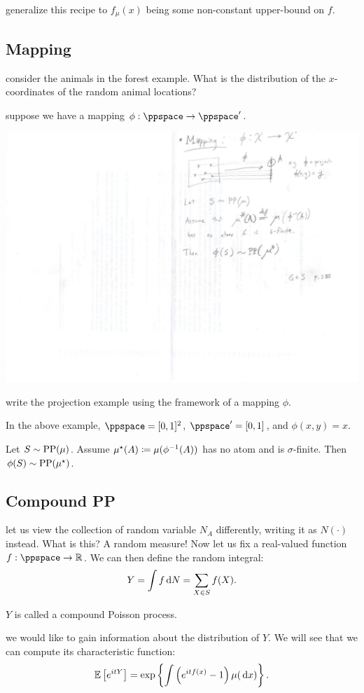 \documentclass{article}
\begin{document}
 generalize this recipe to $f_\mu(x)$ being some non-constant upper-bound on $f$. 


\subsection{Mapping}

 consider the animals in the forest example. What is the distribution of the $x$-coordinates of the random animal locations?

 suppose we have a mapping $\phi : \ppspace \to \ppspace'$.
\begin{center}
	\includegraphics[width=0.5\linewidth]{figures/pp-mapping} 
\end{center} 
 write the projection example using the framework of a mapping $\phi$.

 In the above example, $\ppspace = [0,1]^2$, $\ppspace' = [0,1]$, and $\phi(x, y) = x$.

 Let $S \sim \operatorname{PP}(\mu)$. Assume $\mu^\star(A) \coloneqq \mu(\phi^{-1}(A))$ has no atom and is $\sigma$-finite. Then $\phi(S) \sim \operatorname{PP}(\mu^\star)$.


\subsection{Compound PP}

 let us view the collection of random variable $N_A$ differently, writing it as $N(\cdot)$ instead. What is this? A random measure! Now let us fix a real-valued function $f : \ppspace \to \R$. We can then define the random integral:
\[ Y = \int f \,\mathrm{d} N = \sum_{X \in S} f(X). \]

 $Y$ is called a compound Poisson process.

 we would like to gain information about the distribution of $Y$. We will see that we can compute its characteristic function:
\[ {\mathbb E}\left[e^{itY}\right] = \exp\left\{ \int \left(e^{itf(x)} - 1\right) \mu(\,\mathrm{d} x) \right\}. \]
\end{document}
